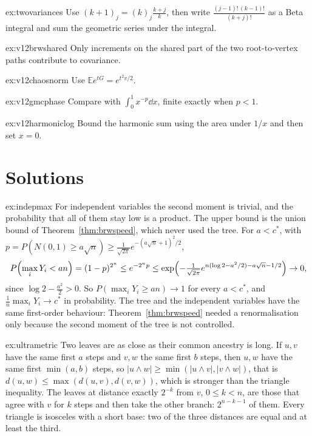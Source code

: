 \begin{hint}{ex:twovariances}
Use $(k+1)_j=(k)_j\frac{k+j}k$, then write $\frac{(j-1)!\,(k-1)!}{(k+j)!}$ as a Beta integral and sum the geometric series under the integral.
\end{hint}

\begin{hint}{ex:v12brwshared}
Only increments on the shared part of the two root-to-vertex paths contribute to covariance.
\end{hint}

\begin{hint}{ex:v12chaosnorm}
Use $\mathbb Ee^{tG}=e^{t^2v/2}$.
\end{hint}

\begin{hint}{ex:v12gmcphase}
Compare with $\int_0^1x^{-p}\dd x$, finite exactly when $p<1$.
\end{hint}

\begin{hint}{ex:v12harmoniclog}
Bound the harmonic sum using the area under $1/x$ and then set $x=0$.
\end{hint}

\section{Solutions}

\begin{solution}{ex:indepmax}
\idea For independent variables the second moment is trivial, and the probability that all of them stay low is a product.
\writeup The upper bound is the union bound of Theorem~\ref{thm:brwspeed}, which never used the tree. For $a<c^*$, with $p=P(N(0,1)\ge a\sqrt n)\ge\frac1{\sqrt{2\pi}}e^{-(a\sqrt n+1)^2/2}$,
\[
P\Bigl(\max_iY_i<an\Bigr)=(1-p)^{2^n}\le e^{-2^np}\le\exp\Bigl(-\tfrac1{\sqrt{2\pi}}e^{n(\log2-a^2/2)-a\sqrt n-1/2}\Bigr)\to0,
\]
since $\log2-\frac{a^2}2>0$. So $P(\max_iY_i\ge an)\to1$ for every $a<c^*$, and $\frac1n\max_iY_i\to c^*$ in probability. The tree and the independent variables have the same first-order behaviour: Theorem~\ref{thm:brwspeed} needed a
renormalisation only because the second moment of the tree is not controlled.
\end{solution}

\begin{solution}{ex:ultrametric}
\idea Two leaves are as close as their common ancestry is long.
\writeup If $u,v$ have the same first $a$ steps and $v,w$ the same first $b$ steps, then $u,w$ have the same first $\min(a,b)$ steps, so $|u\wedge w|\ge\min(|u\wedge v|,|v\wedge w|)$, that is $d(u,w)\le\max(d(u,v),d(v,w))$, which is stronger
than the triangle inequality. The leaves at distance exactly $2^{-k}$ from $v$, $0\le k<n$, are those that agree with $v$ for $k$ steps and then take the other branch: $2^{n-k-1}$ of them. Every triangle is isosceles with a short base:
two of the three distances are equal and at least the third.
\end{solution}

